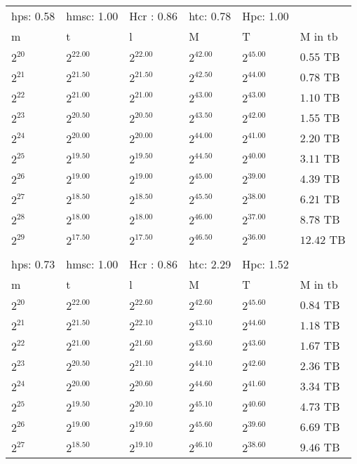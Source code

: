 \begin{tabular}{llllll}
hps: 0.58 & hmsc: 1.00 & Hcr : 0.86 & htc: 0.78 & Hpc: 1.00 &  \\
m & t & l & M & T & M in tb \\
$2^{20}$ & $2^{22.00}$ & $2^{22.00}$ & $2^{42.00}$ & $2^{45.00}$ & $0.55$ TB \\
$2^{21}$ & $2^{21.50}$ & $2^{21.50}$ & $2^{42.50}$ & $2^{44.00}$ & $0.78$ TB \\
$2^{22}$ & $2^{21.00}$ & $2^{21.00}$ & $2^{43.00}$ & $2^{43.00}$ & $1.10$ TB \\
$2^{23}$ & $2^{20.50}$ & $2^{20.50}$ & $2^{43.50}$ & $2^{42.00}$ & $1.55$ TB \\
$2^{24}$ & $2^{20.00}$ & $2^{20.00}$ & $2^{44.00}$ & $2^{41.00}$ & $2.20$ TB \\
$2^{25}$ & $2^{19.50}$ & $2^{19.50}$ & $2^{44.50}$ & $2^{40.00}$ & $3.11$ TB \\
$2^{26}$ & $2^{19.00}$ & $2^{19.00}$ & $2^{45.00}$ & $2^{39.00}$ & $4.39$ TB \\
$2^{27}$ & $2^{18.50}$ & $2^{18.50}$ & $2^{45.50}$ & $2^{38.00}$ & $6.21$ TB \\
$2^{28}$ & $2^{18.00}$ & $2^{18.00}$ & $2^{46.00}$ & $2^{37.00}$ & $8.78$ TB \\
$2^{29}$ & $2^{17.50}$ & $2^{17.50}$ & $2^{46.50}$ & $2^{36.00}$ & $12.42$ TB \\
 &  &  &  &  &  \\
hps: 0.73 & hmsc: 1.00 & Hcr : 0.86 & htc: 2.29 & Hpc: 1.52 &  \\
m & t & l & M & T & M in tb \\
$2^{20}$ & $2^{22.00}$ & $2^{22.60}$ & $2^{42.60}$ & $2^{45.60}$ & $0.84$ TB \\
$2^{21}$ & $2^{21.50}$ & $2^{22.10}$ & $2^{43.10}$ & $2^{44.60}$ & $1.18$ TB \\
$2^{22}$ & $2^{21.00}$ & $2^{21.60}$ & $2^{43.60}$ & $2^{43.60}$ & $1.67$ TB \\
$2^{23}$ & $2^{20.50}$ & $2^{21.10}$ & $2^{44.10}$ & $2^{42.60}$ & $2.36$ TB \\
$2^{24}$ & $2^{20.00}$ & $2^{20.60}$ & $2^{44.60}$ & $2^{41.60}$ & $3.34$ TB \\
$2^{25}$ & $2^{19.50}$ & $2^{20.10}$ & $2^{45.10}$ & $2^{40.60}$ & $4.73$ TB \\
$2^{26}$ & $2^{19.00}$ & $2^{19.60}$ & $2^{45.60}$ & $2^{39.60}$ & $6.69$ TB \\
$2^{27}$ & $2^{18.50}$ & $2^{19.10}$ & $2^{46.10}$ & $2^{38.60}$ & $9.46$ TB \\

\end{tabular}
